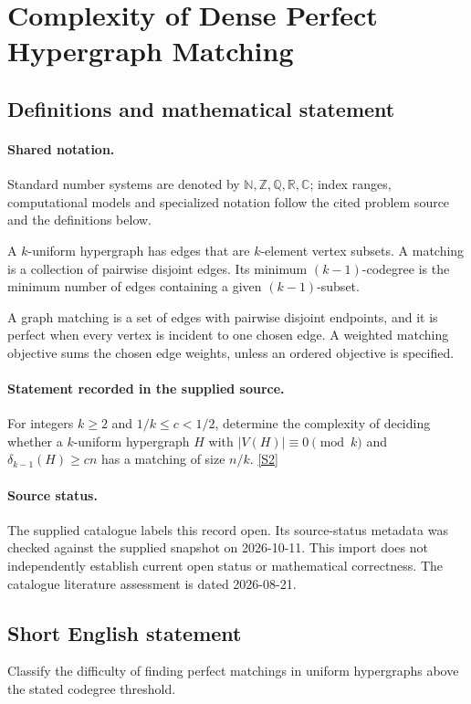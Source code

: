 \documentclass[11pt]{article}
\newcommand{\sref}[2]{\hyperlink{source:#1:#2}{[S#2]}}
\begin{document}
\section{Complexity of Dense Perfect Hypergraph Matching}\label{statement}

\subsection{Definitions and mathematical statement}

\paragraph{Shared notation.}Standard number systems are denoted by $\mathbb N,\mathbb Z,\mathbb Q,\mathbb R,\mathbb C$; index ranges, computational models and specialized notation follow the cited problem source and the definitions below.


A $k$-uniform hypergraph has edges that are $k$-element vertex subsets. A matching is a collection of pairwise disjoint edges. Its minimum $(k-1)$-codegree is the minimum number of edges containing a given $(k-1)$-subset.

A graph matching is a set of edges with pairwise disjoint endpoints, and it is perfect when every vertex is incident to one chosen edge. A weighted matching objective sums the chosen edge weights, unless an ordered objective is specified.
\paragraph{Statement recorded in the supplied source.}
For integers $k\geq2$ and $1/k\leq c<1/2$, determine the complexity of deciding whether a $k$-uniform hypergraph $H$ with $|V(H)|\equiv0\pmod k$ and $\delta_{k-1}(H)\geq cn$ has a matching of size $n/k$. \sref{statement}{2}
\paragraph{Source status.}
The supplied catalogue labels this record open. Its source-status metadata was checked against the supplied snapshot on 2026-10-11. This import does not independently establish current open status or mathematical correctness. The catalogue literature assessment is dated 2026-08-21.
\subsection{Short English statement}
Classify the difficulty of finding perfect matchings in uniform hypergraphs above the stated codegree threshold.
\end{document}
